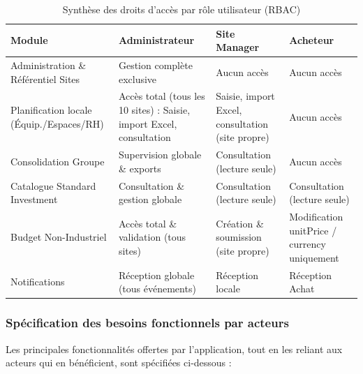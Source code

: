 \begin{table}[H]
\centering
\begin{tabular}{|p{3.5cm}|p{3.5cm}|p{3.5cm}|p{3.5cm}|}
\hline
\textbf{Module} & \textbf{Administrateur} & \textbf{Site Manager} & \textbf{Acheteur} \\ \hline
Administration \& Référentiel Sites & Gestion complète exclusive & Aucun accès & Aucun accès \\ \hline
Planification locale (Équip./Espaces/RH) & Accès total (tous les 10 sites) : Saisie, import Excel, consultation & Saisie, import Excel, consultation (site propre) & Aucun accès \\ \hline
Consolidation Groupe & Supervision globale \& exports & Consultation (lecture seule) & Aucun accès \\ \hline
Catalogue Standard Investment & Consultation \& gestion globale & Consultation (lecture seule) & Consultation (lecture seule) \\ \hline
Budget Non-Industriel & Accès total \& validation (tous sites) & Création \& soumission (site propre) & Modification unitPrice / currency uniquement \\ \hline
Notifications & Réception globale (tous événements) & Réception locale & Réception Achat \\ \hline
\end{tabular}
\caption{Synthèse des droits d'accès par rôle utilisateur (RBAC)}
\label{tab:synthese_roles}
\end{table}

\subsubsection{Spécification des besoins fonctionnels par acteurs}
\label{sec:besoins_par_acteurs}
Les principales fonctionnalités offertes par l'application, tout en les reliant aux acteurs qui en bénéficient, sont spécifiées ci-dessous :


